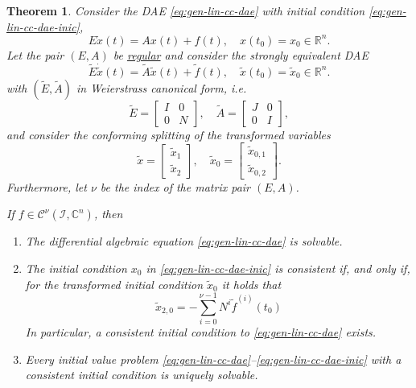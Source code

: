 \documentclass[]{book}
\newtheorem{theorem}{Theorem}[chapter]
\theoremstyle{definition}
\theoremstyle{definition}
\theoremstyle{definition}
\theoremstyle{definition}
\theoremstyle{remark}
\begin{document}
\begin{theorem}
\protect\hypertarget{thm:regularity-means-solvability}{}{\label{thm:regularity-means-solvability} }
Consider the DAE \eqref{eq:gen-lin-cc-dae} with initial condition \eqref{eq:gen-lin-cc-dae-inic},
\[
E \dot x (t) = Ax(t) + f(t), \quad x(t_0) = x_0 \in \mathbb R^{n}.
\]
Let the pair \((E, A)\) be \protect\hyperlink{lem:regularity}{regular} and consider the strongly equivalent DAE
\[
\tilde E \dot {\tilde x} (t) = \tilde A\tilde x(t) + \tilde f(t), \quad \tilde x(t_0) = \tilde x_0 \in \mathbb R^{n}.
\]
with \((\tilde E,\tilde A)\) in Weierstrass canonical form, i.e.
\[
\tilde E = 
\begin{bmatrix}
I & 0 \\  0 &N 
\end{bmatrix}, 
\quad 
\tilde A = 
\begin{bmatrix}
J & 0 \\  0 &I 
\end{bmatrix}, 
\]
and consider the conforming splitting of the transformed variables
\[
\tilde x = 
\begin{bmatrix}
\tilde x_1 \\ \tilde x_2
\end{bmatrix},
\quad
\tilde x_0 = 
\begin{bmatrix}
\tilde x_{0,1} \\ \tilde x_{0,2}
\end{bmatrix}.
\]
Furthermore, let \(\nu\) be the index of the matrix pair \((E,A)\).

If \(f\in \mathcal C^\nu(\mathcal I,\mathbb C^{n})\), then

\begin{enumerate}
\def\labelenumi{\arabic{enumi}.}
\item
  The differential algebraic equation \eqref{eq:gen-lin-cc-dae} is solvable.
\item
  The initial condition \(x_0\) in \eqref{eq:gen-lin-cc-dae-inic} is consistent if, and only if, for the transformed initial condition \(\tilde x_0\) it holds that
  \[
    \tilde x_{2,0} = - \sum_{i=0}^{\nu-1}N^i\tilde f^{(i)}(t_0)
  \]
  In particular, a consistent initial condition to \eqref{eq:gen-lin-cc-dae} exists.
\item
  Every initial value problem \eqref{eq:gen-lin-cc-dae}--\eqref{eq:gen-lin-cc-dae-inic} with a consistent initial condition is uniquely solvable.
\end{enumerate}
\end{theorem}
\end{document}
